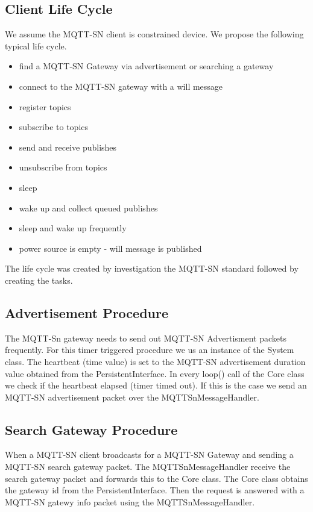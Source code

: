 \subsection{Client Life Cycle}\label{sec:mqttsnclientlifetime}
We assume the MQTT-SN client is constrained device.
We propose the following typical life cycle.
\begin{itemize}
\item find a MQTT-SN Gateway via advertisement or searching a gateway
\item connect to the MQTT-SN gateway with a will message
\item register topics
\item subscribe to topics
\item send and receive publishes
\item unsubscribe from topics
\item sleep 
\item wake up and collect queued publishes
\item sleep and wake up frequently
\item power source is empty - will message is published
\end{itemize}
The life cycle was created by investigation the MQTT-SN standard followed by creating the tasks.

\subsection{Advertisement Procedure}
The MQTT-Sn gateway needs to send out MQTT-SN Advertisment packets frequently.
For this timer triggered procedure we us an instance of the System class.
The heartbeat (time value) is set to the MQTT-SN advertisement duration value obtained from the PersistentInterface.
In every loop() call of the Core class we check if the heartbeat elapsed (timer timed out).
If this is the case we send an MQTT-SN advertisement packet over the MQTTSnMessageHandler.

\subsection{Search Gateway Procedure}
When a MQTT-SN client broadcasts for a MQTT-SN Gateway and sending a MQTT-SN search gateway packet.
The MQTTSnMessageHandler receive the search gateway packet and forwards this to the Core class.
The Core class obtains the gateway id from the PersistentInterface. 
Then the request is answered with a MQTT-SN gatewy info packet using the MQTTSnMessageHandler.

